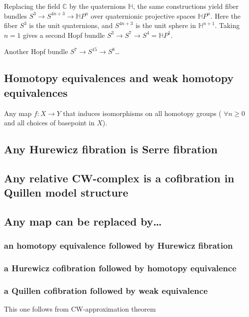 \begin{example}
	Replacing the field $\mathbb{C}$ by the
	quaternions $\mathbb{H}$, the same
	constructions yield fiber bundles $S^3\to
	S^{4n+3}\to\mathbb{H} P^{n}$ over
	quaternionic projective spaces $\mathbb{H}
	P^n$. Here the fiber $S^3$ is the unit
	quaternions, and $S^{4n+3}$ is the unit
	sphere in $\mathbb{H}^{n+1}$. Taking $n=1$
	gives a second Hopf bundle $S^3\to S^7\to
	S^4=\mathbb{H} P^1$.

	Another Hopf bundle $S^7\to S^{15}\to S^8$…
\end{example}

\subsection{Homotopy equivalences and weak
homotopy equivalences}
\label{subsection-homot-equiv-weak-homot}

\begin{definition}
\label{definition-weak-homotopy-equivalence}
	Any map $f:X\to Y$ that induces isomorphisms
	on all homotopy groups ( $\forall n\geq 0$
	and all choices of basepoint in $X$).
\end{definition}

\subsection{Any Hurewicz fibration is Serre
fibration}
\label{subsection-any-hurew-fibra-serre}
\subsection{Any relative CW-complex is a
cofibration in Quillen model structure}
\label{subsection-any-relat-cw-compl-cofib}
\subsection{Any map can be replaced by…}
\label{subsection-any-map-can-be-replaced-by}
\subsubsection{an homotopy equivalence
followed by Hurewicz fibration}
\label{subsection-homot-equiv-follo-hurew}
\subsubsection{a Hurewicz cofibration
followed by homotopy equivalence}
\label{subsection-hurew-cofib-follo-homot}
\subsubsection{a Quillen cofibration followed
by weak equivalence}
\label{subsection-quill-cofib-follo-weak}
This one follows from CW-approximation
theorem

